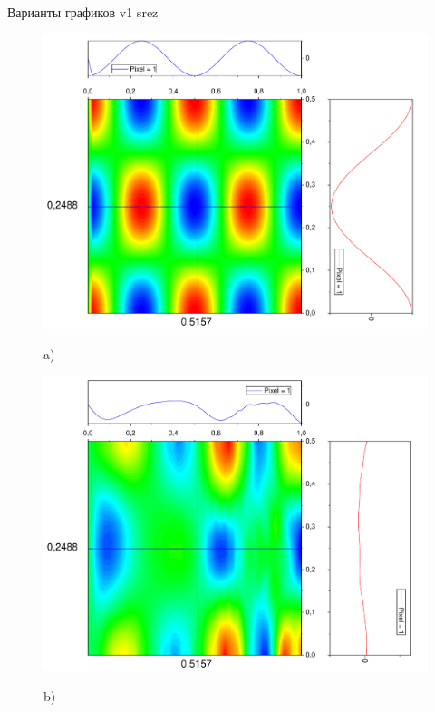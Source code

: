 \documentclass[a4paper,12pt]{article}
\begin{document}
Варианты графиков v1 srez
\begin{figure}[h!]
	\begin{center}
		\begin{minipage}[h]{0.24\linewidth}
			\includegraphics[width=\textwidth]{graphs/graphs_a/v1/wave_t-0_v1_srez} \begin{center}	a)	\end{center}
		\end{minipage}
		\begin{minipage}[h]{0.24\linewidth}
			\includegraphics[width=\textwidth]{graphs/graphs_a/v1/wave_t-6_v1_srez} \begin{center}	b)	\end{center}

\end{minipage}
\end{center}
\end{figure}
\end{document}
